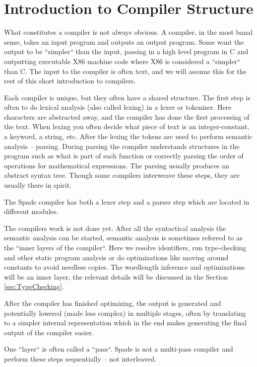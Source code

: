 \documentclass[msc,lith,english]{liuthesis}
\begin{document}
\section{Introduction to Compiler Structure}
What constitutes a compiler is not always obvious. A compiler, in the most banal sense, takes an input program and outputs an output program. Some want the output to be ``simpler`` than the input, passing in a high level program in C and outputting executable X86 machine code where X86 is considered a ``simpler`` than C. The input to the compiler is often text, and we will assume this for the rest of this short introduction to compilers.

Each compiler is unique, but they often have a shared structure. The first step is often to do lexical analysis (also called lexing) in a lexer or tokenizer. Here characters are abstracted away, and the compiler has done the first processing of the text. When lexing you often decide what piece of text is an integer-constant, a keyword, a string, etc. After the lexing the tokens are used to perform semantic analysis -- parsing. During parsing the compiler understands structures in the program such as what is part of each function or correctly parsing the order of operations for mathematical expressions. The parsing usually produces an abstract syntax tree. Though some compilers interweave these steps, they are usually there in spirit.

The Spade compiler has both a lexer step and a parser step which are located in different modules.

The compilers work is not done yet. After all the syntactical analysis the semantic analysis can be started, semantic analysis is sometimes referred to as the ``inner layers of the compiler``. Here we resolve identifiers, run type-checking and other static program analysis or do optimizations like moving around constants to avoid needless copies. The wordlength inference and optimizations will be an inner layer, the relevant details will be discussed in the Section \ref{sec:TypeChecking}. 

After the compiler has finished optimizing, the output is generated and potentially lowered (made less complex) in multiple stages, often by translating to a simpler internal representation which in the end makes generating the final output of the compiler easier.

One ``layer`` is often called a ``pass``. Spade is not a multi-pass compiler and perform these steps sequentially -- not interleaved.
\cite{src:DragonBook}\cite{src:CraftingInterp}\cite{src:KKLectures}
\end{document}
